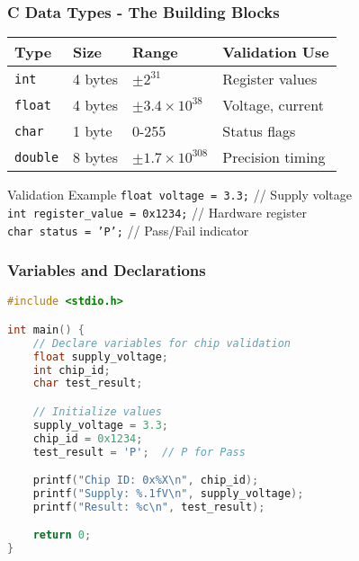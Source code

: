 \documentclass{beamer}
\begin{document}
\begin{frame}
\frametitle{C Data Types - The Building Blocks}
\begin{center}
\begin{tabular}{|l|l|l|l|}
\hline
\textbf{Type} & \textbf{Size} & \textbf{Range} & \textbf{Validation Use} \\
\hline
\texttt{int} & 4 bytes & $\pm 2^{31}$ & Register values \\
\texttt{float} & 4 bytes & $\pm 3.4 \times 10^{38}$ & Voltage, current \\
\texttt{char} & 1 byte & 0-255 & Status flags \\
\texttt{double} & 8 bytes & $\pm 1.7 \times 10^{308}$ & Precision timing \\
\hline
\end{tabular}
\end{center}

\vspace{0.5cm}
\begin{exampleblock}{Validation Example}
\texttt{float voltage = 3.3;} // Supply voltage\\
\texttt{int register\_value = 0x1234;} // Hardware register\\
\texttt{char status = 'P';} // Pass/Fail indicator
\end{exampleblock}
\end{frame}

\begin{frame}[fragile]
\frametitle{Variables and Declarations}
\begin{lstlisting}[language=C]
#include <stdio.h>

int main() {
    // Declare variables for chip validation
    float supply_voltage;
    int chip_id;
    char test_result;

    // Initialize values
    supply_voltage = 3.3;
    chip_id = 0x1234;
    test_result = 'P';  // P for Pass

    printf("Chip ID: 0x%X\n", chip_id);
    printf("Supply: %.1fV\n", supply_voltage);
    printf("Result: %c\n", test_result);

    return 0;
}
\end{lstlisting}
\end{frame}
\end{document}
